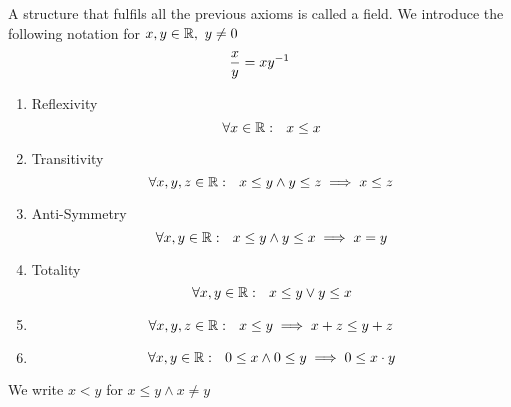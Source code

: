 \documentclass[../../script.tex]{subfiles}
\begin{document}
\begin{rem}
A structure that fulfils all the previous axioms is called a  field. We introduce the following notation for $x, y \in \mathbb{R}, ~y \ne 0$
\[
	\frac{x}{y} = x{y}^{-1}
\]
\end{rem}

\begin{defi}\leavevmode
\begin{enumerate}[label=O\arabic*:]
	\item Reflexivity
	\[
		\forall x \in \mathbb{R}: ~~x \le x
	\]
	
	\item Transitivity
	\[
		\forall x, y, z \in \mathbb{R}: ~~x \le y \wedge y \le z \implies x \le z
	\]
	
	\item Anti-Symmetry
	\[
		\forall x, y \in \mathbb{R}: ~~x \le y \wedge y \le x \implies x = y
	\]
	
	\item Totality
	\[
		\forall x, y \in \mathbb{R}: ~~x \le y \vee y \le x
	\]
	
	\item 
	\[
		\forall x, y, z \in \mathbb{R}: ~~x \le y \implies x + z \le y + z
	\]
	
	\item 
	\[
		\forall x, y \in \mathbb{R}: ~~0 \le x \wedge 0 \le y \implies 0 \le x \cdot y
	\]
\end{enumerate}
We write $x < y$ for $x \le y \wedge x \ne y$
\end{defi}
\end{document}
